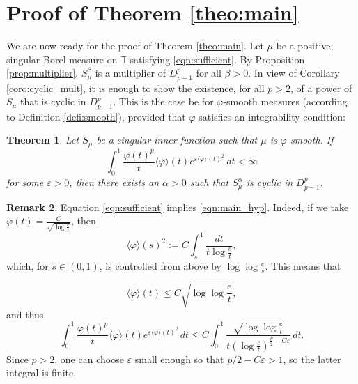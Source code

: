 \documentclass{birkjour}
\numberwithin{equation}{section}
\theoremstyle{plain}
\newtheorem{theo}{Theorem}[section]
\theoremstyle{definition}
\newtheorem{rem}[theo]{Remark}
\newcommand{\T}{\mathbb{T}}
\newcommand{\1}{\mathds{1}}
\newcommand{\charphi}{\langle \varphi\rangle}
\begin{document}
\section{Proof of Theorem \ref{theo:main}}
\label{sec:proof}

We are now ready for the proof of Theorem \ref{theo:main}. Let $\mu$ be a positive, singular Borel measure on $\T$ satisfying \eqref{eqn:sufficient}. By Proposition \ref{prop:multiplier}, $S_\mu^\beta$ is a multiplier of $D^p_{p-1}$ for all $\beta>0$. In view of Corollary \ref{coro:cyclic_mult}, it is enough to show the existence, for all $p>2$, of a power of $S_\mu$ that is cyclic in $D^p_{p-1}$. This is the case be for $\varphi$-smooth measures (according to Definition \ref{defi:smooth}), provided that $\varphi$ satisfies an integrability condition:
\begin{theo}
\label{theo:power}
Let $S_\mu$ be a singular inner function such that $\mu$ is $\varphi$-smooth. If 
\begin{equation}
\label{eqn:main_hyp}    
\int_0^1\frac{\varphi(t)^p}{t}\charphi(t)e^{\varepsilon\charphi(t)^2}\,dt<\infty
\end{equation}
for some $\varepsilon>0$, then there exists an $\alpha>0$ such that $S_\mu^\alpha$ is cyclic in $D^p_{p-1}$.
\end{theo}
\begin{rem}
\label{ex:sqrtlog}
Equation \eqref{eqn:sufficient} implies \eqref{eqn:main_hyp}. Indeed, if we take $\varphi(t)=\frac{C}{\sqrt{\log\frac{e}{t}}}$, then
\[\charphi(s)^2 := C \int_s^1 \frac{dt}{t \log \frac{e}{t}},\] which, for $s \in (0,1)$, is controlled from above by $\log\log \frac{e}{s}$. This means that
 
 \[
\charphi(t)\leq C\sqrt{\log\log\frac{e}{t}}, 
 \]
 and thus 
 \[
\int_0^1\frac{\varphi(t)^p}{t}\langle\varphi\rangle(t)e^{\varepsilon\langle\varphi\rangle(t)^2}\,dt\le C \int_0^1 \frac{\sqrt{\log\log\frac{e}{t}}}{t\left(\log\frac{e}{t}\right)^{\frac{p}{2}-C\varepsilon}}\,dt.
\]
Since $p>2$, one can choose $\varepsilon$ small enough so that $p/2-C\varepsilon>1$, so the latter integral is finite.
\end{rem}
\end{document}
